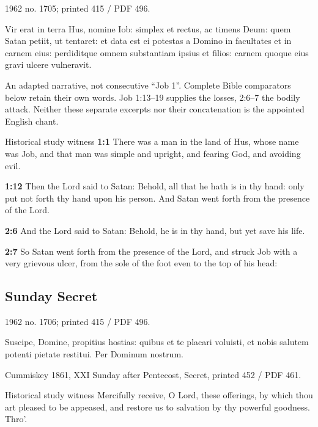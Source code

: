 1962 no. 1705; printed 415 / PDF 496.

\begin{latinproper}
Vir erat in terra Hus, nomine Iob: simplex et rectus, ac timens Deum: quem Satan petiit, ut tentaret: et data est ei potestas a Domino in facultates et in carnem eius: perdiditque omnem substantiam ipsius et filios: carnem quoque eius gravi ulcere vulneravit.
\end{latinproper}

An adapted narrative, not consecutive “Job 1”. Complete Bible comparators below retain their own words. Job 1:13–19 supplies the losses, 2:6–7 the bodily attack. Neither these separate excerpts nor their concatenation is the appointed English chant.

\begin{englishwitness}{Historical study witness}
\textbf{1:1} There was a man in the land of Hus, whose name was Job, and that man was simple and upright, and fearing God, and avoiding evil.

\textbf{1:12} Then the Lord said to Satan: Behold, all that he hath is in thy hand: only put not forth thy hand upon his person. And Satan went forth from the presence of the Lord.

\textbf{2:6} And the Lord said to Satan: Behold, he is in thy hand, but yet save his life.

\textbf{2:7} So Satan went forth from the presence of the Lord, and struck Job with a very grievous ulcer, from the sole of the foot even to the top of his head:
\end{englishwitness}

\subsection{Sunday Secret}
\label{proper-secret}

1962 no. 1706; printed 415 / PDF 496.

\begin{latinproper}
Suscipe, Domine, propitius hostias: quibus et te placari voluisti, et nobis salutem potenti pietate restitui. Per Dominum nostrum.
\end{latinproper}

Cummiskey 1861, XXI Sunday after Pentecost, Secret, printed 452 / PDF 461.

\begin{englishwitness}{Historical study witness}
Mercifully receive, O Lord, these offerings, by which thou art pleased to be appeased, and restore us to salvation by thy powerful goodness. Thro’.
\end{englishwitness}

